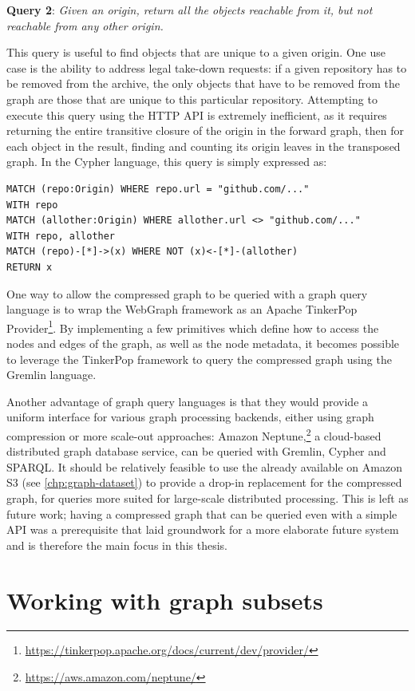 \textbf{Query 2}: \emph{Given an origin, return all the objects reachable from
it, but not reachable from any other origin.}

This query is useful to find objects that are unique to a given origin. One
use case is the ability to address legal take-down requests: if a given
repository has to be removed from the archive, the only objects that have to be
removed from the graph are those that are unique to this particular repository.
Attempting to execute this query using the HTTP API is extremely inefficient,
as it requires returning the entire transitive closure of the origin in the
forward graph, then for each object in the result, finding and counting its
origin leaves in the transposed graph. In the Cypher language, this query is
simply expressed as:

\begin{verbatim}
MATCH (repo:Origin) WHERE repo.url = "github.com/..."
WITH repo
MATCH (allother:Origin) WHERE allother.url <> "github.com/..."
WITH repo, allother
MATCH (repo)-[*]->(x) WHERE NOT (x)<-[*]-(allother)
RETURN x
\end{verbatim}

One way to allow the compressed graph to be queried with a graph query language
is to wrap the WebGraph framework as an Apache TinkerPop
Provider\footnote{\url{https://tinkerpop.apache.org/docs/current/dev/provider/}}.
By implementing a few primitives which define how to access the nodes and edges
of the graph, as well as the node metadata, it becomes possible to leverage the
TinkerPop framework to query the compressed graph using the Gremlin language.

Another advantage of graph query languages is that they would provide a uniform
interface for various graph processing backends, either using graph compression
or more scale-out approaches: Amazon
Neptune,\footnote{\url{https://aws.amazon.com/neptune/}} a cloud-based
distributed graph database service, can be queried with Gremlin, Cypher and
SPARQL\@. It should be relatively feasible to use the \SWHGD{} already
available on Amazon S3 (see \cref{chp:graph-dataset}) to provide a drop-in
replacement for the compressed graph, for queries more suited for large-scale
distributed processing. This is left as future work; having a compressed
graph that can be queried even with a simple API was a prerequisite that laid
groundwork for a more elaborate future system and is therefore the main focus
in this thesis.


\section{Working with graph subsets}%
\label{sec:subdatasets}

